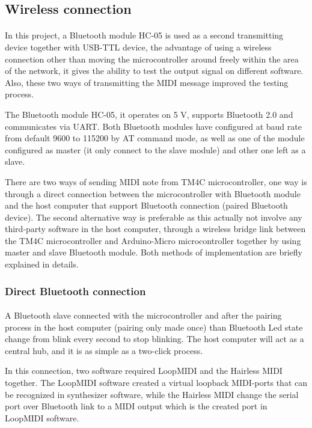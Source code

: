 \documentclass{article}
\begin{document}
\subsection{Wireless connection}
\paragraph{}In this project, a Bluetooth module HC-05 is used as a second transmitting device together with USB-TTL device, the advantage of using a wireless connection other than moving the microcontroller around freely within the area of the network, it gives the ability to test the output signal on different software. Also, these two ways of transmitting the MIDI message improved the testing process. 

The Bluetooth module HC-05, it operates on 5 V, supports Bluetooth 2.0 and communicates via UART. Both Bluetooth modules have configured at baud rate from default 9600 to 115200 by AT command mode, as well as one of the module configured as master (it only connect to the slave module) and other one left as a slave.

There are two ways of sending MIDI note from TM4C microcontroller, one way is through a direct connection between the microcontroller with Bluetooth module and the host computer that support Bluetooth connection (paired Bluetooth device). The second alternative way is preferable as this actually not involve any third-party software in the host computer, through a wireless bridge link between the TM4C microcontroller and Arduino-Micro microcontroller together by using master and slave Bluetooth module. Both methods of implementation are briefly explained in details.
\subsubsection{Direct Bluetooth connection}
\paragraph{}A Bluetooth slave connected with the microcontroller and after the pairing process in the host computer (pairing only made once) than Bluetooth Led state change from blink every second to stop blinking. The host computer will act as a central hub, and it is as simple as a two-click process.

In this connection, two software required LoopMIDI \cite{loopmidi} and the Hairless MIDI \cite{hairlessmidiserial} together. The LoopMIDI software created a virtual loopback MIDI-ports that can be recognized in synthesizer software, while the Hairless MIDI change the serial port over Bluetooth link to a MIDI output which is the created port in LoopMIDI software. 
\end{document}
